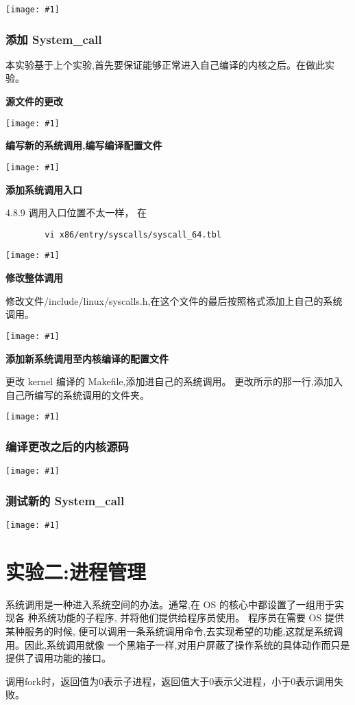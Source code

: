 \documentclass{article}
\newcommand{\incpng}[1]{\texttt{[image: \#1]}}
\begin{document}
\begin{CJK}{UTF8}{gkai}
\incpng{../v}

\subsubsection{添加 System\_call}
本实验基于上个实验,首先要保证能够正常进入自己编译的内核之后。在做此实验。

\textbf{源文件的更改}

\incpng{../newcall}

\textbf{编写新的系统调用,编写编译配置文件}

\incpng{../c}

\textbf{添加系统调用入口}

4.8.9 调用入口位置不太一样， 在
\begin{verbatim}
        vi x86/entry/syscalls/syscall_64.tbl
\end{verbatim}

\incpng{../entry}

\textbf{修改整体调用}

修改文件/include/linux/syscalls.h,在这个文件的最后按照格式添加上自己的系统调用。

\incpng{../linuxcall}

\textbf{添加新系统调用至内核编译的配置文件}

更改 kernel 编译的 Makefile,添加进自己的系统调用。
更改所示的那一行,添加入自己所编写的系统调用的文件夹。

\incpng{../core}

\subsubsection{编译更改之后的内核源码}
\incpng{../make}
\subsubsection{测试新的 System\_call}
\incpng{../test}



\section{实验二:进程管理}
系统调用是一种进入系统空间的办法。通常,在 OS 的核心中都设置了一组用于实现各
种系统功能的子程序,
并将他们提供给程序员使用。
程序员在需要 OS 提供某种服务的时候,
便可以调用一条系统调用命令,去实现希望的功能,这就是系统调用。因此,系统调用就像
一个黑箱子一样,对用户屏蔽了操作系统的具体动作而只是提供了调用功能的接口。

调用fork时，返回值为0表示子进程，返回值大于0表示父进程，小于0表示调用失败。



\end{CJK}
\end{document}
